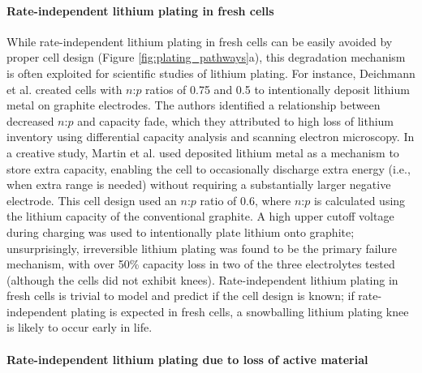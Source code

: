 \documentclass[journal=jpclcd,manuscript=article]{achemso}
\begin{document}
\paragraph{Rate-independent lithium plating in fresh cells}

While rate-independent lithium plating in fresh cells can be easily avoided by proper cell design (Figure \ref{fig:plating_pathways}a), this degradation mechanism is often exploited for scientific studies of lithium plating.
For instance, Deichmann et al.\cite{deichmann_investigating_2020} created cells with $n$:$p$ ratios of 0.75 and 0.5 to intentionally deposit lithium metal on graphite electrodes. The authors identified a relationship between decreased $n$:$p$ and capacity fade, which they attributed to high loss of lithium inventory using differential capacity analysis and scanning electron microscopy. In a creative study, Martin et al.\cite{martin_cycling_2020} used deposited lithium metal as a mechanism to store extra capacity, enabling the cell to occasionally discharge extra energy (i.e., when extra range is needed) without requiring a substantially larger negative electrode. This cell design used an $n$:$p$ ratio of 0.6, where $n$:$p$ is calculated using the lithium capacity of the conventional graphite. A high upper cutoff voltage during charging was used to intentionally plate lithium onto graphite; unsurprisingly, irreversible lithium plating was found to be the primary failure mechanism, with over 50\% capacity loss in two of the three electrolytes tested (although the cells did not exhibit knees). Rate-independent lithium plating in fresh cells is trivial to model and predict if the cell design is known; if rate-independent plating is expected in fresh cells, a snowballing lithium plating knee is likely to occur early in life.

\paragraph{Rate-independent lithium plating due to loss of active material}
\end{document}
